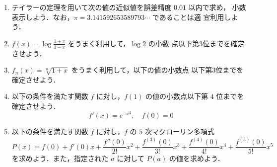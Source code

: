 \documentclass[11pt, uplatex, dvipdfmx, twoside]{jsarticle}
\newcommand{\ds}{\displaystyle}
\begin{document}
\begin{enumerate}[label=\arabic{section}.\arabic*]

  \setlength{\itemsep}{1zh}
  
\item テイラーの定理を用いて次の値の近似値を誤差精度 $0.01$ 以内で求め，
  小数表示しよう．なお，$\pi = 3.141592653589793\cdots$ であることは適
  宜利用しよう．

  \vspace{1ex}


\item $\ds f(x) = \log\frac{1+x}{1-x}$ をうまく利用して，$\log 2$ の小数
  点以下第3位までを確定させよう．

\item $f_n(x) = \sqrt[n]{1+x}$ をうまく利用して，以下の値の小数点
  以下第3位までを確定させよう．

  \vspace{1ex}


\item 以下の条件を満たす関数 $f$ に対し，$f(1)$ の値の小数点以下第 $4$
  位までを確定させよう．
  \[
    f'(x) = e^{-x^2}, \quad f(0)=0
  \]

\item 以下の条件を満たす関数 $f$ に対し，$f$ の $5$ 次マクローリン多項式
  \[
    P(x) = f(0) + f'(0)x + \frac{f''(0)}{2!}x^2 +
    \frac{f^{(3)}(0)}{3!}x^3 + \frac{f^{(4)}(0)}{4!}x^4 + \frac{f^{(5)}(0)}{5!}x^5
  \]
  を求めよう．また，指定された $a$ に対して $P(a)$ の値を求めよう．
  

\end{enumerate}
\end{document}
